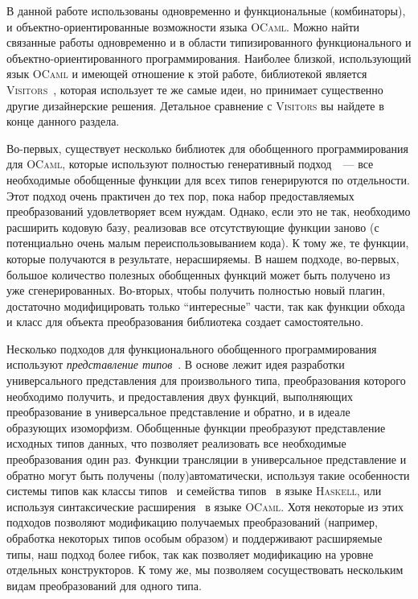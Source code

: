 
В данной работе использованы одновременно и функциональные (комбинаторы), и объектно-ориентированные возможности языка \textsc{OCaml}. Можно найти связанные работы  одновременно и в области типизированного функционального и объектно-ориентированного программирования. Наиболее близкой, использующий язык \textsc{OCaml} и имеющей отношение к этой работе, библиотекой является \textsc{Visitors}~\cite{Visitors}, которая использует те же самые идеи, но принимает существенно другие дизайнерские решения. Детальное сравнение с \textsc{Visitors} вы найдете в конце данного раздела.

Во-первых, существует несколько библиотек для обобщенного программирования для \textsc{OCaml}, которые используют полностью генеративный подход~\cite{Yallop,PPXLib}~--- все необходимые обобщенные функции для всех типов генерируются по отдельности. Этот подход очень практичен до тех пор, пока набор предоставляемых преобразований удовлетворяет всем нуждам. Однако, если это не так, необходимо расширить кодовую базу, реализовав все отсутствующие функции заново
(с потенциально очень малым переиспользовыванием кода). К тому же, те функции,
которые получаются в результате, нерасширяемы. В нашем подходе, во-первых,
большое количество полезных обобщенных функций может быть получено из уже сгенерированных. Во-вторых, чтобы получить полностью новый плагин, достаточно модифицировать только ``интересные'' части, так как функции обхода и класс для объекта преобразования библиотека создает самостоятельно.

Несколько подходов для функционального обобщенного программирования используют 
\emph{представление типов}~\cite{Hinze}. В основе лежит идея разработки универсального представления для произвольного типа, преобразования которого необходимо получить, и предоставления двух функций, выполняющих преобразование в универсальное представление и обратно, и в идеале образующих изоморфизм. Обобщенные функции преобразуют представление исходных типов данных, что позволяет реализовать все необходимые преобразования один раз. Функции трансляции в универсальное представление и обратно могут быть получены (полу)автоматически, используя такие особенности системы типов  как классы типов~\cite{Hinze,ALaCarte} и семейства типов~\cite{InstantGenerics} в языке \textsc{Haskell}, или  используя синтаксические расширения~\cite{GenericOCaml} в языке \textsc{OCaml}. Хотя некоторые из этих подходов позволяют модификацию получаемых преобразований (например, обработка некоторых типов особым образом) и поддерживают расширяемые типы, наш подход более гибок, так как позволяет модификацию на уровне отдельных конструкторов. К тому же, мы позволяем сосуществовать нескольким видам преобразований для одного типа.

